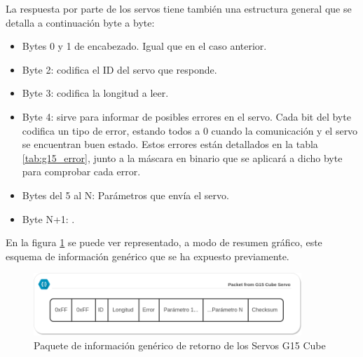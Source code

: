 	La respuesta por parte de los servos tiene también una estructura general que se detalla a continuación byte a byte:
	\begin{itemize}
		\item Bytes 0 y 1 de encabezado. Igual que en el caso anterior.
		\item Byte 2: codifica el ID del servo que responde.
		\item Byte 3: codifica la longitud a leer.
		\item Byte 4: sirve para informar de posibles errores en el servo. Cada bit del byte codifica un tipo de error, estando todos a 0 cuando la comunicación y el servo se encuentran buen estado. Estos errores están detallados en la tabla \ref{tab:g15_error}, junto a la máscara en binario que se aplicará a dicho byte para comprobar cada error.
		\item Bytes del 5 al N: Parámetros que envía el servo.
		\item Byte N+1: .
	\end{itemize}
	
	 En la figura \ref{fig:app:registrosg15:comunicacion_mensaje_from_servo} se puede ver representado, a modo de resumen gráfico, este esquema de información genérico que se ha expuesto previamente.	
	 
	 \begin{figure}[H]
	    	\centering
	    	\includegraphics[width=0.9\textwidth]{figuras/Imagenes_SW/Packet_From_G15.png}   
	    	\caption{Paquete de información genérico de retorno de los Servos G15 Cube}
	    	\label{fig:app:registrosg15:comunicacion_mensaje_from_servo}
	 \end{figure}
	
